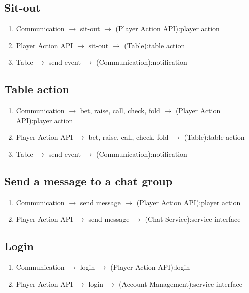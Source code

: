 \documentclass[a4paper,11pt]{report}
\begin{document}
\subsection{Sit-out}
\begin{enumerate}
\item Communication $\rightarrow$ sit-out $\rightarrow$ (Player Action API):player action
\item Player Action API $\rightarrow$ sit-out $\rightarrow$ (Table):table action
\item Table $\rightarrow$ send event $\rightarrow$ (Communication):notification
\end{enumerate}

\subsection{Table action}
\begin{enumerate}
\item Communication $\rightarrow$ bet, raise, call, check, fold $\rightarrow$ (Player Action API):player action
\item Player Action API $\rightarrow$ bet, raise, call, check, fold $\rightarrow$ (Table):table action
\item Table $\rightarrow$ send event $\rightarrow$ (Communication):notification
\end{enumerate}

\subsection{Send a message to a chat group}
\begin{enumerate}
\item Communication $\rightarrow$ send message $\rightarrow$ (Player Action API):player action
\item Player Action API $\rightarrow$ send message $\rightarrow$ (Chat Service):service interface
\end{enumerate}

\subsection{Login}
\begin{enumerate}
\item Communication $\rightarrow$ login $\rightarrow$ (Player Action API):login
\item Player Action API $\rightarrow$ login $\rightarrow$ (Account Management):service interface
\end{enumerate}
\end{document}
